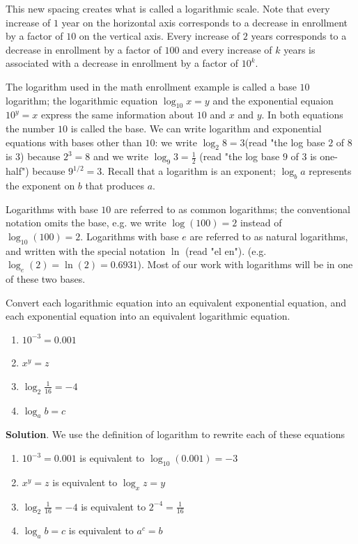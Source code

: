 \documentclass[10pt,]{book}
\theoremstyle{ptxdefinitionnotitle}
\theoremstyle{ptxdefinitiontitle}
\theoremstyle{ptxdefinitionnotitle}
\theoremstyle{ptxdefinitiontitle}
\theoremstyle{ptxdefinitionnotitle}
\theoremstyle{ptxdefinitiontitle}
\numberwithin{equation}{section}
\begin{document}
\hypertarget{p-281}{}%
This new spacing creates what is called a logarithmic scale. Note that every increase of \(1\) year on the horizontal axis corresponds to a decrease in enrollment by a factor of \(10\) on the vertical axis. Every increase of \(2\) years corresponds to a decrease in enrollment by a factor of \(100\) and every increase of \(k\) years is associated with a decrease in enrollment by a factor of \(10^k\).%
\par
\hypertarget{p-282}{}%
The logarithm used in the math enrollment example is called a base \(10\) logarithm; the logarithmic equation \(\log_{10} x = y\) and the exponential equaion \(10^y = x\) express the same information about \(10\) and \(x\) and \(y\). In both equations the number \(10\) is called the base. We can write logarithm and exponential equations with bases other than \(10\): we write \(\log_2 8 = 3 \)(read "the log base \(2\) of \(8\) is \(3\)) because \(2^3 = 8\) and we write \(\log_9 3= \frac{1}{2}\) (read "the log base \(9\) of \(3\) is one-half") because \(9^{1/2} = 3\). Recall that a logarithm is an exponent; \(\log_b a\) represents the exponent on \(b\) that produces \(a\).%
\par
\hypertarget{p-283}{}%
Logarithms with base \(10\) are referred to as common logarithms; the conventional notation omits the base, e.g. we write \(\log(100) = 2\) instead of \(\log_{10} (100) = 2\). Logarithms with base \(e\) are referred to as natural logarithms, and written with the special notation \(\ln\)  (read "el en"). (e.g. \(\log_e (2) = \ln(2) = 0.6931\)).  Most of our work with logarithms will be in one of these two bases.%
\begin{example}\label{example-20}
\hypertarget{p-284}{}%
Convert each logarithmic equation into an equivalent exponential equation, and each exponential equation into an equivalent logarithmic equation.%
\leavevmode%
\begin{enumerate}
\item\hypertarget{li-172}{}\(10^{-3} = 0.001\)%
\item\hypertarget{li-173}{}\(x ^ y = z\)%
\item\hypertarget{li-174}{}\(\log_2 \frac{1}{16} = -4\)%
\item\hypertarget{li-175}{}\(\log_a b = c\)%
\end{enumerate}
\par\smallskip%
\noindent\textbf{Solution}.\hypertarget{solution-20}{}\quad%
\hypertarget{p-285}{}%
We use the definition of logarithm to rewrite each of these equations%
\leavevmode%
\begin{enumerate}
\item\hypertarget{li-176}{}\(10^{-3} = 0.001\) is equivalent to \(\log_{10} (0.001) = -3\)%
\item\hypertarget{li-177}{}\(x ^ y = z\) is equivalent to \(\log_x z = y\)%
\item\hypertarget{li-178}{}\(\log_2 \frac{1}{16} = -4\) is equivalent to \(2 ^ {-4} = \frac{1}{16}\)%
\item\hypertarget{li-179}{}\(\log_a b = c\) is equivalent to \(a ^ c = b\)%
\end{enumerate}
\end{example}
\end{document}
